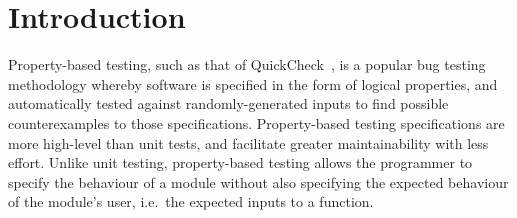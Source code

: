 \documentclass[sigplan,nonacm,10pt]{acmart}
\begin{document}






\maketitle


\section{Introduction}
Property-based testing, such as that of QuickCheck~\citep{qc}, is a popular bug testing
methodology whereby software is specified in the form of logical
properties, and automatically tested against randomly-generated inputs
to find possible counterexamples to those specifications. Property-based testing specifications
are more high-level than unit tests, and facilitate greater maintainability with less effort.
Unlike unit testing, property-based testing allows the programmer to specify
the behaviour of a module without also specifying the expected behaviour of the module's user, i.e.\ the expected inputs to a function.
\end{document}
